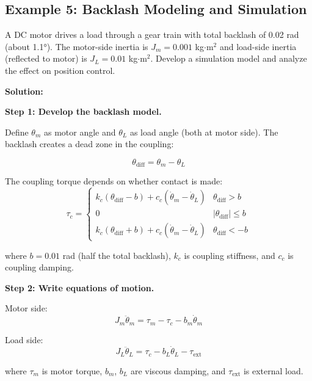 \subsection{Example 5: Backlash Modeling and Simulation}

\begin{example}
\label{ex:backlash_simulation}
A DC motor drives a load through a gear train with total backlash of 0.02 rad (about 1.1°). The motor-side inertia is $J_m = 0.001$ kg$\cdot$m$^2$ and load-side inertia (reflected to motor) is $J_L = 0.01$ kg$\cdot$m$^2$. Develop a simulation model and analyze the effect on position control.

\textbf{Solution:}

\textbf{Step 1: Develop the backlash model.}

Define $\theta_m$ as motor angle and $\theta_L$ as load angle (both at motor side). The backlash creates a dead zone in the coupling:

\begin{equation}
\theta_{\text{diff}} = \theta_m - \theta_L
\end{equation}

The coupling torque depends on whether contact is made:
\begin{equation}
\tau_c = \begin{cases}
k_c(\theta_{\text{diff}} - b) + c_c(\dot{\theta}_m - \dot{\theta}_L) & \theta_{\text{diff}} > b \\
0 & |\theta_{\text{diff}}| \leq b \\
k_c(\theta_{\text{diff}} + b) + c_c(\dot{\theta}_m - \dot{\theta}_L) & \theta_{\text{diff}} < -b
\end{cases}
\end{equation}

where $b = 0.01$ rad (half the total backlash), $k_c$ is coupling stiffness, and $c_c$ is coupling damping.

\textbf{Step 2: Write equations of motion.}

Motor side:
\begin{equation}
J_m \ddot{\theta}_m = \tau_m - \tau_c - b_m\dot{\theta}_m
\end{equation}

Load side:
\begin{equation}
J_L \ddot{\theta}_L = \tau_c - b_L\dot{\theta}_L - \tau_{\text{ext}}
\end{equation}

where $\tau_m$ is motor torque, $b_m$, $b_L$ are viscous damping, and $\tau_{\text{ext}}$ is external load.


\end{example}

